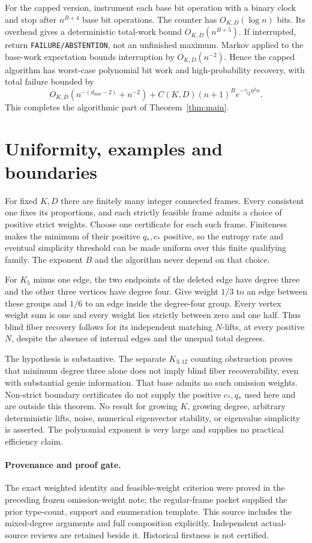 \documentclass[11pt]{article}
\begin{document}
For the capped version, instrument each base bit operation with a binary
clock and stop after $n^{B+4}$ base bit operations. The counter has
$O_{K,D}(\log n)$ bits. Its overhead gives a
deterministic total-work bound $O_{K,D}(n^{B+5})$. If interrupted, return
\texttt{FAILURE/ABSTENTION}, not an unfinished maximum. Markov applied
to the base-work expectation bounds interruption by $O_{K,D}(n^{-2})$.
Hence the capped algorithm has worst-case polynomial bit work and
high-probability recovery, with total
failure bounded by
\[
 O_{K,D}(n^{-(d_{\min}-2)}+n^{-2})
       +C(K,D)(n+1)^B e^{-\gamma_Q\eta^2n}.
\]
This completes the algorithmic part of Theorem~\ref{thm:main}.

\section{Uniformity, examples and boundaries}
For fixed $K,D$ there are finitely many integer connected frames.
Every consistent one fixes its proportions, and each strictly feasible
frame admits a choice of positive strict weights. Choose one certificate
for each such frame. Finiteness makes the minimum of their positive
$q_*,c_*$ positive, so the entropy rate and eventual simplicity
threshold can be made uniform over this finite qualifying family.
The exponent $B$ and the algorithm never depend on that choice.

For $K_5$ minus one edge, the two endpoints of the deleted edge have
degree three and the other three vertices have degree four. Give weight
$1/3$ to an edge between these groups and $1/6$ to an edge inside the
degree-four group. Every vertex weight sum is one and every weight lies
strictly between zero and one half. Thus blind fiber recovery follows
for its independent matching $N$-lifts, at every positive $N$, despite
the absence of internal edges and the unequal total degrees.

The hypothesis is substantive. The separate $K_{3,12}$ counting
obstruction proves that minimum degree three alone does not imply
blind fiber recoverability, even with substantial genie information.
That base admits no such omission weights. Non-strict boundary
certificates do not supply the positive $c_*,q_*$ used here and are
outside this theorem. No result for growing $K$, growing degree,
arbitrary deterministic lifts, noise, numerical eigenvector stability,
or eigenvalue simplicity is asserted. The polynomial exponent is very
large and supplies no practical efficiency claim.

\paragraph{Provenance and proof gate.}
The exact weighted identity and feasible-weight criterion were proved
in the preceding frozen omission-weight note; the regular-frame packet
supplied the prior type-count, support and enumeration template.
This source includes the mixed-degree arguments and full composition
explicitly. Independent actual-source reviews are retained beside it.
Historical firstness is not certified.
\end{document}
